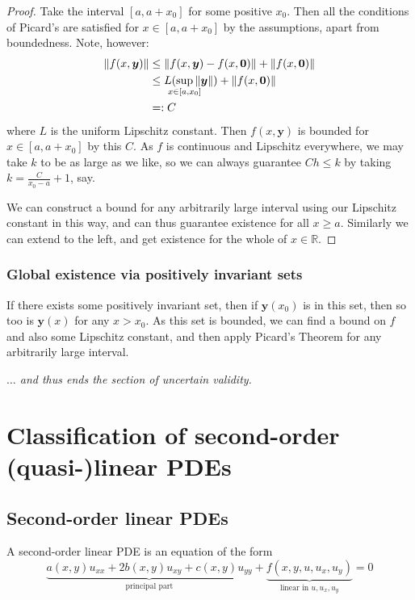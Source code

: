 \documentclass[10pt,fleqn]{article}
\newcommand{\reals}{\mathbb{R}}
\newcommand{\vc}[1]{\boldsymbol{#1}}
\theoremstyle{definition} \newtheorem{defn}{Definition}[section]
\theoremstyle{plain}      \newtheorem{thm}[defn]{Theorem}
\theoremstyle{plain}      \newtheorem{lem}[defn]{Lemma}
\theoremstyle{definition} \newtheorem{prop}[defn]{Proposition}
\theoremstyle{definition} \newtheorem{cor}[defn]{Corollary}
\theoremstyle{definition} \newtheorem{ex}[defn]{Example}
\theoremstyle{definition} \newtheorem{rem}[defn]{Remark}
\begin{document}
\begin{proof}
    Take the interval $[a,a+x_0]$ for some positive $x_0$.
    Then all the conditions of Picard's are satisfied for $x\in[a,a+x_0]$ by the assumptions, apart from boundedness.
    Note, however:
    \begin{align*}
        \|f(x,\vc{y})\|
        &\leq
        \|f(x,\vc{y})-f(x,\vc{0})\|+\|f(x,\vc{0})\|\\
        &\leq
        L(\smashoperator{\sup_{x\in[a,x_0]}}\|\vc{y}\|)+\|f(x,\vc{0})\|\\
        &=:
        C
    \end{align*}
    where $L$ is the uniform Lipschitz constant.
    Then $f(x,\vc{y})$ is bounded for $x\in[a,a+x_0]$ by this $C$.
    As $f$ is continuous and Lipschitz everywhere, we may take $k$ to be as large as we like, so we can always guarantee $Ch\leq k$ by taking $k=\frac{C}{x_0-a}+1$, say.

    We can construct a bound for any arbitrarily large interval using our Lipschitz constant in this way, and can thus guarantee existence for all $x\geq a$. Similarly we can extend to the left, and get existence for the whole of $x\in\reals$.
\end{proof}


\subsubsection{Global existence via positively invariant sets}

If there exists some positively invariant set, then if $\vc{y}(x_0)$ is in this set, then so too is $\vc{y}(x)$ for any $x>x_0$.
As this set is bounded, we can find a bound on $f$ and also some Lipschitz constant, and then apply Picard's Theorem for any arbitrarily large interval.

\emph{$\ldots$ and thus ends the section of uncertain validity.}


\section{Classification of second-order (quasi-)linear PDEs}


\subsection{Second-order linear PDEs}

A second-order linear PDE is an equation of the form
\begin{equation}\label{so-pde}
    \underbrace{a(x,y)u_{xx} + 2b(x,y)u_{xy} + c(x,y)u_{yy}}_{\text{principal part}} + \underbrace{f(x,y,u,u_x,u_y)}_{\text{linear in }u,u_x,u_y}=0
\end{equation}
\end{document}
